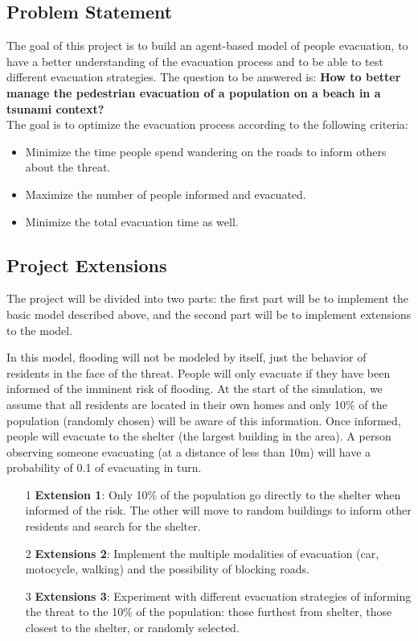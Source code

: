 \documentclass[11pt,a4paper]{article}
\begin{document}
\subsection{Problem Statement}
\begin{large}
The goal of this project is to build an agent-based model of people evacuation, to have a better understanding of the evacuation process and to be able to test different evacuation strategies. The question to be answered is: \textbf{How to better manage the pedestrian evacuation of a population on a beach in a tsunami context?} \\
The goal is to optimize the evacuation process according to the following criteria:
\begin{itemize}
    \item Minimize the time people spend wandering on the roads to inform others about the threat.
    \item Maximize the number of people informed and evacuated.
    \item Minimize the total evacuation time as well.
\end{itemize}

\subsection{Project Extensions}

The project will be divided into two parts: the first part will be to implement the basic model described above, and the second part will be to implement extensions to the model.

In this model, flooding will not be modeled by itself, just the behavior of residents in the face of the threat. People will only evacuate if they have been informed of the imminent risk of flooding. At the start of the simulation, we assume that all residents are located in their own homes and only 10\% of the population (randomly chosen) will be aware of this information. Once informed, people will evacuate to the shelter (the largest building in the area). A person observing someone evacuating (at a distance of less than 10m) will have a probability of 0.1 of evacuating in turn.

\begin{itemize}
\item[1] \textbf{Extension 1}: Only 10\% of the population go directly to the shelter when informed of the risk. The other will move to random buildings to inform other residents and search for the shelter.
\item[2] \textbf{Extensions 2}: Implement the multiple modalities of evacuation (car, motocycle, walking) and the possibility of blocking roads.
\item[3] \textbf{Extensions 3}: Experiment with different evacuation strategies of informing the threat to the 10\% of the population: those furthest from shelter, those closest to the shelter, or randomly selected.
\end{itemize}

\end{large} 
\end{document}
